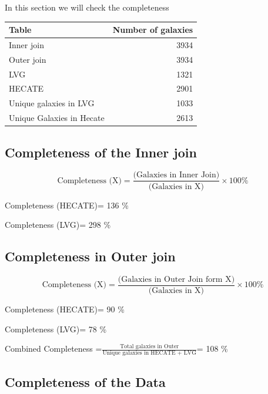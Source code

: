 \documentclass[
]{article}
\begin{document}
In this section we will check the completeness

\begin{longtable}[]{@{}lr@{}}
\toprule\noalign{}
Table & Number of galaxies \\
\midrule\noalign{}
\endhead
\bottomrule\noalign{}
\endlastfoot
Inner join & 3934 \\
Outer join & 3934 \\
LVG & 1321 \\
HECATE & 2901 \\
Unique galaxies in LVG & 1033 \\
Unique Galaxies in Hecate & 2613 \\
\end{longtable}

\subsection{Completeness of the Inner
join}\label{completeness-of-the-inner-join}

\[
\text{Completeness (X)}=\frac{\text{(Galaxies in Inner Join)}}{\text{(Galaxies in X)}}×100\%
\]

Completeness (HECATE)= 136 \%

Completeness (LVG)= 298 \%

\subsection{Completeness in Outer
join}\label{completeness-in-outer-join}

\[
\text{Completeness (X)}=\frac{\text{(Galaxies in Outer Join form X)}}{\text{(Galaxies in X)}}×100\%
\]

Completeness (HECATE)= 90 \%

Completeness (LVG)= 78 \%

Combined Completeness
=\(\frac{\text{Total galaxies in Outer}}{\text{Unique galaxies in HECATE + LVG}}\)=
108 \%

\subsection{Completeness of the Data}\label{completeness-of-the-data}
\end{document}
